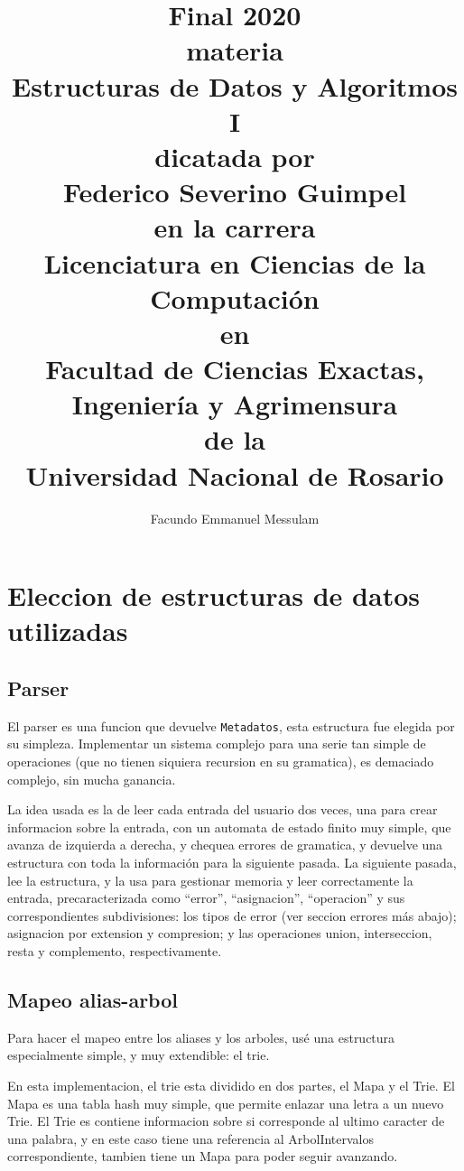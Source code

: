\documentclass{article}
\title{Final 2020\\
	{\small{materia}}\\
	Estructuras de Datos y Algoritmos I\\
	{\small{dicatada por}}\\
	Federico Severino Guimpel\\
	{\small{en la carrera}}\\
	Licenciatura en Ciencias de la Computación\\
	{\small{en}}\\
	Facultad de Ciencias Exactas, Ingeniería y Agrimensura\\
	{\small{de la}}\\
	Universidad Nacional de Rosario}
\author{Facundo Emmanuel Messulam\footnotemark\\}
\begin{document}
    \begin{titlepage}
        \maketitle
        \thispagestyle{empty}
    \end{titlepage}

	\section*{Eleccion de estructuras de datos utilizadas}

	\subsection*{Parser}
	
	El parser es una funcion que devuelve \verb|Metadatos|, esta estructura fue elegida por su simpleza. Implementar un sistema complejo para una serie tan simple de operaciones (que no tienen siquiera recursion en su gramatica), es demaciado complejo, sin mucha ganancia.
	
	La idea usada es la de leer cada entrada del usuario dos veces, una para crear informacion sobre la entrada, con un automata de estado finito muy simple, que avanza de izquierda a derecha, y chequea errores de gramatica, y devuelve una estructura con toda la información para la siguiente pasada. La siguiente pasada, lee la estructura, y la usa para gestionar memoria y leer correctamente la entrada, precaracterizada como ``error'', ``asignacion'', ``operacion'' y sus correspondientes subdivisiones: los tipos de error (ver seccion errores más abajo); asignacion por extension y compresion; y las operaciones union, interseccion, resta y complemento, respectivamente.
	
	\subsection*{Mapeo alias-arbol}

	Para hacer el mapeo entre los aliases y los arboles, usé una estructura especialmente simple, y muy extendible: el trie.
	
	En esta implementacion, el trie esta dividido en dos partes, el Mapa y el Trie. El Mapa es una tabla hash muy simple, que permite enlazar una letra a un nuevo Trie. El Trie es contiene informacion sobre si corresponde al ultimo caracter de una palabra, y en este caso tiene una referencia al ArbolIntervalos correspondiente, tambien tiene un Mapa para poder seguir avanzando.
	
\end{document}
